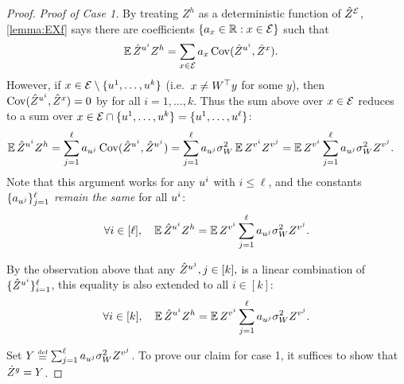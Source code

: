 \documentclass[main.tex]{subfiles}
\begin{document}
\begin{proof}
  \emph{Proof of Case 1.}
  By treating $Z^h$ as a deterministic function of $\hat Z^{\mathcal{E}}$, \cref{lemma:EXf} says there are coefficients $\{a_{x} \in \mathbb{R}: x \in \mathcal{E}\}$ such that
  \begin{align*}
  \operatorname*{\mathbb{E}} \hat Z^{u^i} Z^h
    &=
      \sum_{x \in \mathcal{E}} a_{x} \operatorname{Cov}(\hat Z^{u^i}, \hat Z^x)
      .
  \end{align*}
  However, if $x \in \mathcal{E}\setminus \{u^1, \ldots, u^k\}$ (i.e.\ $x \ne W^\top y$ for some $y$), then $\operatorname{Cov}(\hat Z^{u^{i}}, \hat Z^x) = 0$ by  for all $i=1,\ldots,k$.
  Thus the sum above over $x\in\mathcal{E}$ reduces to a sum over $x\in \mathcal{E} \cap \{u^1, \ldots, u^k\} = \{u^1, \ldots, u^\ell\}$:
  \begin{align*}
  \operatorname*{\mathbb{E}}  \hat Z^{u^i} Z^{h} 
    &=
      \sum_{j=1}^{\ell} a_{u^j} \operatorname{Cov}(\hat Z^{u^{i}}, \hat Z^{u^{j}})
    =
      \sum_{j=1}^{\ell} a_{u^j} \sigma_W^2
        \operatorname*{\mathbb{E}}  Z^{v^i} Z^{v^j} 
    =
      \operatorname*{\mathbb{E}}
        Z^{v^i}
        \sum_{j=1}^{\ell} a_{u^j} \sigma_W^2
          Z^{v^j}
      .
  \end{align*}
  Note that this argument works for any $u^i$ with $i \le \ell$, and the constants $\{a_{u^j}\}_{j=1}^{\ell}$ \emph{remain the same} for all $u^i$:
  \begin{equation*}
  \forall i \in [\ell],\quad
  \operatorname*{\mathbb{E}}  \hat Z^{u^i} Z^{h} 
    =
      \operatorname*{\mathbb{E}}
        Z^{v^i}
        \sum_{j=1}^{\ell} a_{u^j} \sigma_W^2
          Z^{v^j}
      .
  \end{equation*}

  By the observation above that any $\hat Z^{u^{j}}, j \in [k],$ is a linear combination of $\{\hat Z^{u^i}\}_{i=1}^{\ell}$, this equality is also extended to all $i \in [k]$:
  \begin{equation}
  \forall i \in [k],\quad
  \EV  \Zhat^{\uu^i} Z^{h} 
    =
      \EV
        Z^{\vv^i}
        \sum_{j=1}^{\ell} a_{\uu^j} \sigma_W^2
          Z^{\vv^j}
      .
      \label{eqn:partialAdjunction}
  \end{equation}

  Set $Y \defeq \sum_{j=1}^{\ell} a_{\uu^j} \sigma_W^2
  Z^{\vv^j}$.
  To prove our claim for case 1, it suffices to show that $\dot Z^{g} = Y$.


\end{proof}
\end{document}
